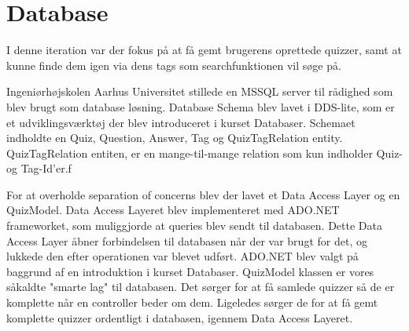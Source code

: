 \chapter{Database}
I denne iteration var der fokus på at få gemt brugerens oprettede quizzer, samt at kunne finde dem igen via dens tags som searchfunktionen vil søge på. 

Ingeniørhøjskolen Aarhus Universitet stillede en MSSQL server til rådighed som blev brugt som database løsning. Database Schema blev lavet i DDS-lite, som er et udviklingsværktøj der blev introduceret i kurset Databaser. Schemaet indholdte en Quiz, Question, Answer, Tag og QuizTagRelation entity. QuizTagRelation entiten, er en mange-til-mange relation som kun indholder Quiz- og Tag-Id'er.f


For at overholde separation of concerns blev der lavet et Data Access Layer og en QuizModel. Data Access Layeret blev implementeret med ADO.NET frameworket, som muliggjorde at queries blev sendt til databasen. Dette Data Access Layer åbner forbindelsen til databasen når der var brugt for det, og lukkede den efter operationen var blevet udført. ADO.NET blev valgt på baggrund af en introduktion i kurset Databaser. QuizModel klassen er vores såkaldte "smarte lag" til databasen. Det sørger for at få samlede quizzer så de er komplette når en controller beder om dem. Ligeledes sørger de for at få gemt komplette quizzer ordentligt i databasen, igennem Data Access Layeret.



